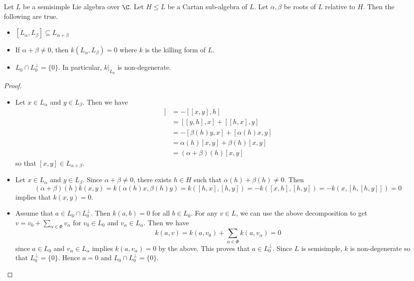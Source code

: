 \documentclass[a4paper]{article}
\begin{document}
\begin{prp}{}{} Let $L$ be a semisimple Lie algebra over $\C$. Let $H\leq L$ be a Cartan sub-algebra of $L$. Let $\alpha,\beta$ be roots of $L$ relative to $H$. Then the following are true. 
\begin{itemize}
\item $[L_\alpha,L_\beta]\subseteq L_{\alpha+\beta}$
\item If $\alpha+\beta\neq 0$, then $k(L_\alpha,L_\beta)=0$ where $k$ is the killing form of $L$. 
\item $L_0\cap L_0^\perp=\{0\}$. In particular, $k|_{L_0}$ is non-degenerate. 
\end{itemize} \tcbline
\begin{proof}~\\
\begin{itemize}
\item Let $x\in L_\alpha$ and $y\in L_\beta$. Then we have 
\begin{align*}
[h,[x,y]]&=-[[x,y],h]\\
&=[[y,h],x]+[[h,x],y]\\
&=-[\beta(h)y,x]+[\alpha(h)x,y]\\
&=\alpha(h)[x,y]+\beta(h)[x,y]\\
&=(\alpha+\beta)(h)[x,y]
\end{align*}
so that $[x,y]\in L_{\alpha+\beta}$. 
\item Let $x\in L_\alpha$ and $y\in L_\beta$. Since $\alpha+\beta\neq 0$, there exists $h\in H$ such that $\alpha(h)+\beta(h)\neq 0$. Then $$(\alpha+\beta)(h)k(x,y)=k(\alpha(h)x,\beta(h)y)=k([h,x],[h,y])=-k([x,h],[h,y])=-k(x,[h,[h,y]])=0$$ implies that $k(x,y)=0$. 
\item Assume that $a\in L_0\cap L_0^\perp$. Then $k(a,b)=0$ for all $b\in L_0$. For any $v\in L$, we can use the above decomposition to get $v=v_0+\sum_{\alpha\in\Phi}v_\alpha$ for $v_0\in L_0$ and $v_\alpha\in L_\alpha$. Then we have $$k(a,v)=k(a,v_0)+\sum_{\alpha\in\Phi}k(a,v_\alpha)=0$$ since $a\in L_0$ and $v_\alpha\in L_\alpha$ implies $k(a,v_\alpha)=0$ by the above. This proves that $a\in L_0^\perp$. Since $L$ is semisimple, $k$ is non-degenerate so that $L_0^\perp=\{0\}$. Hence $a=0$ and $L_0\cap L_0^\perp=\{0\}$. 
\end{itemize}
\end{proof}
\end{prp}
\end{document}
